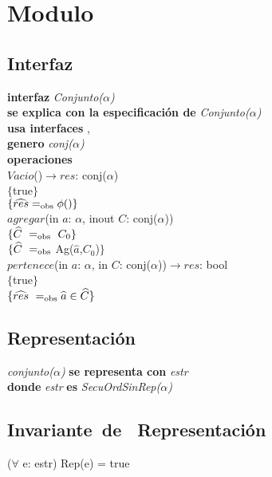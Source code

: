 \section*{Modulo }

\subsection*{Interfaz}
\textbf{interfaz} \textit{Conjunto($\alpha$)}\\
\textbf{se explica con la especificaci\'on de} \textit{Conjunto($\alpha$)}\\
\textbf{usa interfaces} , \\
\textbf{genero} \textit{conj($\alpha$)}\\

\textbf{operaciones}\\
$Vacio$()$\longrightarrow res$: conj($\alpha$)\\
$\{$true$\}$\\
$\{\widehat{res} =_{\mathrm{obs}} \phi()\}$\\

$agregar$(in $a$: $\alpha$, inout $C$: conj($\alpha$))\\
$\{\widehat{C}\ =_{\mathrm{obs}}\ C_0\}$\\
$\{\widehat{C}\ =_{\mathrm{obs}}$ Ag($\widehat{a}$,$C_0$)$\}$\\

$pertenece$(in $a$: $\alpha$, in $C$: conj($\alpha$))$\longrightarrow res$: bool\\
$\{$true$\}$\\
$\{\widehat{res}\ =_{\mathrm{obs}} \widehat{a}\in \widehat{C}\}$\\

\subsection*{Representaci\'on}
\textit{conjunto($\alpha$)} \textbf{se representa con} \textit{estr}\\
\textbf{donde} \textit{estr} \textbf{es} \textit{SecuOrdSinRep($\alpha$)}\\

\subsection*{Invariante\ de \ Representaci\'on}
\vspace{11pt}
($\forall$ e: estr) Rep(e) = true
\vspace{33pt}

